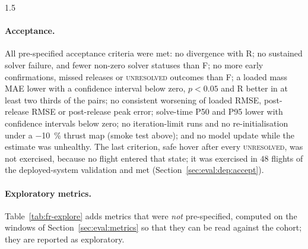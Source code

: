 \begin{spacing}{1.5}
\paragraph{Acceptance.} All pre-specified acceptance criteria were met: no
divergence with R; no sustained solver failure, and fewer non-zero solver
statuses than F; no more early confirmations, missed releases or
\textsc{unresolved} outcomes than F; a loaded mass MAE lower with a confidence
interval below zero, $p<0.05$ and R better in at least two thirds of the pairs;
no consistent worsening of loaded RMSE, post-release RMSE or post-release peak
error; solve-time P50 and P95 lower with confidence intervals below zero; no
iteration-limit runs and no re-initialisation under a \SI{-10}{\percent} thrust
map (smoke test above); and no model update while the estimate was unhealthy.
The last criterion, safe hover after every \textsc{unresolved}, was not exercised,
because no flight entered that state; it was exercised in $48$ flights of the
deployed-system validation and met (Section~\ref{sec:eval:dep:accept}).

\paragraph{Exploratory metrics.} Table~\ref{tab:fr-explore} adds metrics that
were \emph{not} pre-specified, computed on the windows of
Section~\ref{sec:eval:metrics} so that they can be read against the cohort; they
are reported as exploratory.


\end{spacing}
